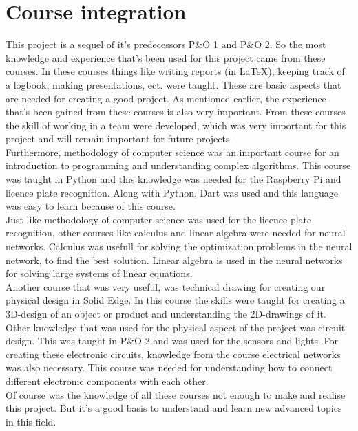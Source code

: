 \section{Course integration}\label{sec:course-integration}
This project is a sequel of it's predecessors P\&O 1 and P\&O 2. So the most knowledge and experience that's been used for this project came from these courses. In these courses things like writing reports (in \LaTeX), keeping track of a logbook, making presentations, ect. were taught. These are basic aspects that are needed for creating a good project. As mentioned earlier, the experience that's been gained from these courses is also very important. From these courses the skill of working in a team were developed, which was very important for this project and will remain important for future projects. \\

\noindent Furthermore, methodology of computer science was an important course for an introduction to programming and understanding complex algorithms. This course was taught in Python and this knowledge was needed for the Raspberry Pi and licence plate recognition. Along with Python, Dart was used and this language was easy to learn because of this course.  \\

\noindent Just like methodology of computer science was used for the licence plate recognition, other courses like calculus and linear algebra were needed for neural networks. Calculus was usefull for solving the optimization problems in the neural network, to find the best solution. Linear algebra is used in the neural networks for solving large systems of linear equations. \\  

\noindent Another course that was very useful, was technical drawing for creating our physical design in Solid Edge. In this course the skills were taught for creating a 3D-design of an object or product and understanding the 2D-drawings of it. Other knowledge that was used for the physical aspect of the project was circuit design. This was taught in P\&O 2 and was used for the sensors and lights. For creating these electronic circuits, knowledge from the course electrical networks was also necessary. This course was needed for understanding how to connect different electronic components with each other.\\

\noindent Of course was the knowledge of all these courses not enough to make and realise this project. But it's a good basis to understand and learn new advanced topics in this field.  

\clearpage
{}



\clearpage